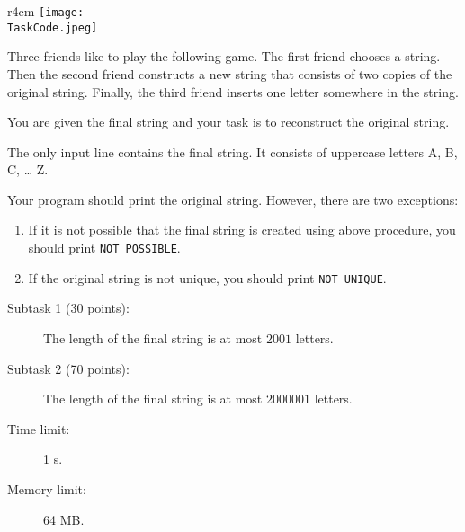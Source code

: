 \documentclass{boi2014}
\renewcommand{\TaskCode}{friends}
\begin{document}
    \begin{wrapfigure}{r}{4cm}
        \vspace{-24pt}
		\texttt{[image: \\TaskCode.jpeg]}
	\end{wrapfigure}
    Three friends like to play the following game.
    The first friend chooses a string.
    Then the second friend constructs a new string that consists of
    two copies of the original string. 
    Finally, the third friend inserts one letter somewhere in the string.

    \Task
    You are given the final string and your task is to reconstruct the original
    string.

    \Input
    The only input line contains the final string. It consists of
    uppercase letters A, B, C, \ldots{} Z.

    \Output
    Your program should print the original string.
    However, there are two exceptions:
    \begin{enumerate}
        \item If it is not possible that the final string is created using above
        procedure, you should print {\tt NOT POSSIBLE}.
        \item If the original string is not unique, you should print {\tt NOT
        UNIQUE}.
    \end{enumerate}
    

    \Examples


    \Scoring

    \begin{description}
        \item[Subtask 1 (30 points):] The length of the final string is at
        most $2001$ letters.
        \item[Subtask 2 (70 points):] The length of the final string is at
        most $2000001$ letters.
    \end{description}

    \Constraints

    \begin{description}
        \item[Time limit:] 1 s.
        \item[Memory limit:] 64 MB.
    \end{description}
\end{document}
